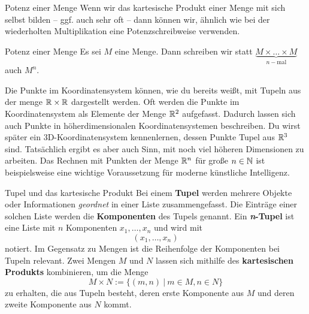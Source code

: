 \documentclass[../../main.tex]{subfiles}
\begin{document}
\begin{advanced}{Potenz einer Menge}
    Wenn wir das kartesische Produkt einer Menge mit sich selbst bilden -- ggf. auch sehr oft -- dann können wir, ähnlich wie bei der wiederholten Multiplikation eine Potenzschreibweise verwenden.

    \begin{definition}{Potenz einer Menge}
        Es sei $M$ eine Menge. Dann schreiben wir statt $\underbrace{M\times \dots\times M}_{n-\text{mal}}$ auch $M^n$.
    \end{definition}

    Die Punkte im Koordinatensystem können, wie du bereits weißt, mit Tupeln aus der menge $\mathbb{R}\times\mathbb{R}$ dargestellt werden. Oft werden die Punkte im Koordinatensystem als Elemente der Menge $\mathbb{R}^2$ aufgefasst. Dadurch lassen sich auch Punkte in höherdimensionalen Koordinatensystemen beschreiben. Du wirst später ein 3D-Koordinatensystem kennenlernen, dessen Punkte Tupel aus $\mathbb{R}^3$ sind. Tatsächlich ergibt es aber auch Sinn, mit noch viel höheren Dimensionen zu arbeiten. Das Rechnen mit Punkten der Menge $\mathbb{R}^n$ für große $n\in\mathbb{N}$ ist beispielsweise eine wichtige Voraussetzung für moderne künstliche Intelligenz.
\end{advanced}
\fi
\begin{nutshell}{Tupel und das kartesische Produkt}
    Bei einem \textbf{Tupel} werden mehrere Objekte oder Informationen \emph{geordnet} in einer Liste zusammengefasst. Die Einträge einer solchen Liste werden die \textbf{Komponenten} des Tupels genannt. Ein \textbf{\emph{n}-Tupel} ist eine Liste mit $n$ Komponenten $x_1,\dots,x_n$ und wird mit \[(x_1,\dots,x_n)\] 
    notiert. Im Gegensatz zu Mengen ist die Reihenfolge der Komponenten bei Tupeln relevant. Zwei Mengen $M$ und $N$ lassen sich mithilfe des \textbf{kartesischen Produkts} kombinieren, um die Menge 
    \[M\times N:=\{(m,n)~|~m\in M, n\in N\}\]
    zu erhalten, die aus Tupeln besteht, deren erste Komponente aus $M$ und deren zweite Komponente aus $N$ kommt.
\end{nutshell}
\end{document}
